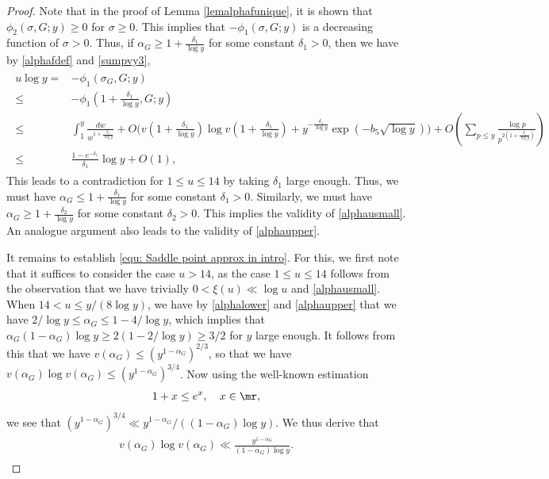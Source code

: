 \documentclass[twoside,leqno,10pt, A4]{amsart}
\begin{document}
\begin{proof}
 Note that in the proof of Lemma \ref{lemalphafunique}, it is shown that $\phi_2(\sigma, G;y) \geq 0$ for $\sigma \geq 0$. This implies that $-\phi_1(\sigma, G;y)$  is a decreasing function of $\sigma>0$. Thus, if $\alpha_G \geq 1+\frac {\delta_1}{\log y}$ for some constant $\delta_1>0$, then we have by \eqref{alphafdef} and \eqref{sumpvy3},   
\begin{align*}
\begin{split}
  u\log y =& -\phi_1(\sigma_G, G;y) \\
  \leq & -\phi_1(1+\frac {\delta_1}{\log y}, G;y) \\
  \leq & \int^{y}_1\frac {dw}{w^{1+\frac {\delta_1}{\log y}}}+ O\Big(v(1+\frac {\delta_1}{\log y})\log v(1+\frac {\delta_1}{\log y})+y^{-\frac {\delta_1}{\log y}}\exp(-b_5\sqrt{\log y})\Big)+O(\sum_{p \leq y}\frac {\log p}{p^{2(1+\frac {\delta_1}{\log y})}}) \\
  \leq & \frac {1-e^{-\delta_1}}{\delta_1}\log y+O(1),
\end{split}
\end{align*}
  This leads to a contradiction for $1 \leq u \leq 14$ by taking $\delta_1$ large enough. Thus, we must have $\alpha_G \leq 1+\frac {\delta_1}{\log y}$ for some constant $\delta_1>0$. Similarly, we must have $\alpha_G \geq 1+\frac {\delta_2}{\log y}$ for some constant $\delta_2>0$. This implies the validity of \eqref{alphausmall}. An analogue argument also leads to the validity of \eqref{alphaupper}.

 It remains to establish \eqref{equ: Saddle point approx in intro}. For this, we first note that it suffices to consider the case $u > 14$, as the case $1 \leq u \leq 14$ follows from the observation that we have trivially $0<\xi(u) \ll \log u$ and \eqref{alphausmall}. When $14 < u \leq y/(8\log y)$, we have by \eqref{alphalower} and \eqref{alphaupper} that we have $2/\log y \leq \alpha_G \leq 1-4/\log y$, which implies that $\alpha_G(1-\alpha_G)\log y \geq 2(1-2/\log y) \geq 3/2$ for $y$ large enough. It follows from this that we have $v(\alpha_G) \leq (y^{1-\alpha_G})^{2/3}$, so that we have $v(\alpha_G)\log v(\alpha_G) \leq (y^{1-\alpha_G})^{3/4}$. Now using the well-known estimation
\begin{align}
\label{1xbound}
\begin{split}
 1+x \leq e^x, \quad x \in \mr,
\end{split}
\end{align}
 we see that $(y^{1-\alpha_G})^{3/4} \ll y^{1-\alpha_G}/((1-\alpha_G)\log y)$. We thus derive that
\begin{align}
\label{vest}
\begin{split}
  v(\alpha_G)\log v(\alpha_G) \ll \frac {y^{1-\alpha_G}}{(1-\alpha_G)\log y}.
\end{split}
\end{align}   


\end{proof}
\end{document}
